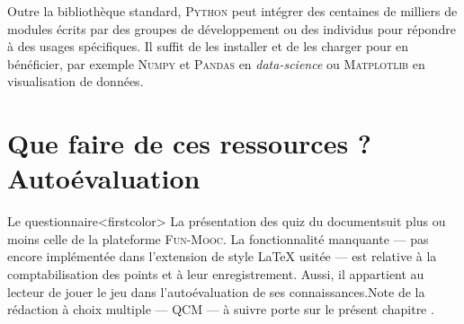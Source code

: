 Outre la bibliothèque standard, \textsc{Python} peut intégrer des centaines de milliers de modules écrits par des groupes de développement ou des individus pour répondre à des usages spécifiques. Il suffit de les installer et de les charger pour en bénéficier, par exemple \textsc{Numpy} et \textsc{Pandas} en \textit{data-science} ou \textsc{Matplotlib} en visualisation de données.




\vfill\pagebreak





\section[Que faire de ces ressources ? Quiz]{Que faire de ces ressources ? Autoévaluation}
\label{sec:XI.5}

Le questionnaire\caution[t]<firstcolor>{%
La présentation des quiz du document\linebreak suit plus ou moins celle de la platefor\-me \textsc{Fun-Mooc}. La fonctionnalité manquante --- pas encore implémentée dans l'extension de style \LaTeX{} usitée --- est relative à la comptabilisation des points et à leur enregistrement. Aussi, il appartient au lecteur de jouer le jeu dans l'auto\-évaluation de ses connaissances.}{Note de la rédaction}
à choix multiple%
--- QCM --- à suivre porte sur le présent chapitre .
\parnotes

\vspace{6pt}

